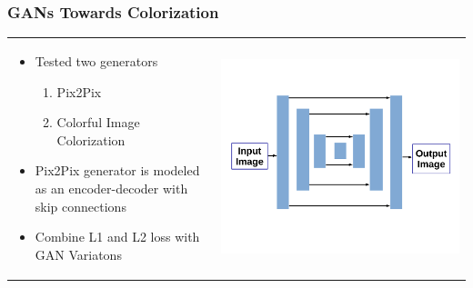 \documentclass{beamer}
\begin{document}
\begin{frame}
\frametitle{\textbf{GANs Towards Colorization}}

\begin{tabular}{ll}
\begin{minipage}{0.55\textwidth}
   \begin{itemize}      
      \item Tested two generators
	   \begin{enumerate}[$-$]
         \item Pix2Pix
         \item Colorful Image Colorization
         \vspace{1mm}
      \end{enumerate}
      \item Pix2Pix generator is  modeled as an encoder-decoder with skip connections
      \vspace{1mm}
      \item Combine L1 and L2 loss with GAN Variatons
   \end{itemize}
\end{minipage}
&
\begin{minipage}{0.5\textwidth}
\hspace{-5mm}
\includegraphics[width=\linewidth]{12.pdf}\end{minipage}
\end{tabular}


\end{frame}
\end{document}
